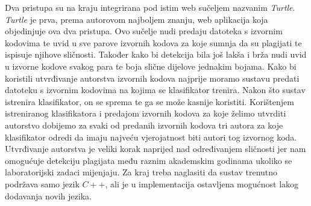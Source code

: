 	Dva pristupa su na kraju integrirana pod istim web sučeljem nazvanim \textit{Turtle}. \textit{Turtle} je prva, prema autorovom najboljem znanju, web aplikacija koja objedinjuje ova dva pristupa. Ovo sučelje nudi predaju datoteka s izvornim kodovima te uvid u sve parove izvornih kodova za koje sumnja da su plagijati te ispisuje njihove sličnosti. Također kako bi detekcija bila još lakša i brža nudi uvid u izvorne kodove svakog para te boja slične dijelove jednakim bojama. Kako bi koristili utvrđivanje autorstva izvornih kodova najprije moramo sustavu predati datoteku s izvornim kodovima na kojima se klasifikator trenira. Nakon što sustav istrenira klasifikator, on se sprema te ga se može kasnije koristiti. Korištenjem istreniranog klasifikatora i predajom izvornih kodova za koje želimo utvrditi autorstvo dobijemo za svaki od predanih izvornih kodova tri autora za koje klasifikator odredi da imaju najveću vjerojatnost biti autori tog izvornog koda. Utvrđivanje autorstva je veliki korak naprijed nad određivanjem sličnosti jer nam omogućuje detekciju plagijata među raznim akademskim godinama ukoliko se laboratorijski zadaci mijenjaju. Za kraj treba naglasiti da sustav trenutno podržava samo jezik $C++$, ali je u implementacija ostavljena mogućnost lakog dodavanja novih jezika.

